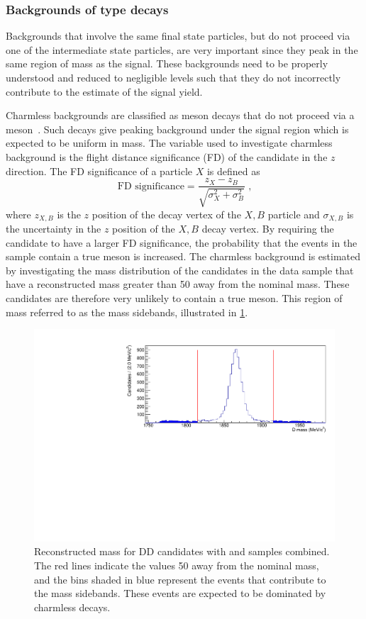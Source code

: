 \subsubsection{Backgrounds of type \boldmath {} decays}
\label{sec:backgrounds:charmless}

Backgrounds that involve the same final state particles, but do not proceed via one of the intermediate state particles, are very important since they peak in the same region of \Bm mass as the signal. These backgrounds need to be properly understood and reduced to negligible levels such that they do not incorrectly contribute to the estimate of the signal yield. 

Charmless backgrounds are classified as \Bm meson decays that do not proceed via a \Dz meson~\eg \decay{\Bm}{\Kstarm\pip\pim}. Such decays give peaking background under the signal region which is expected to be uniform in \Dz mass. The variable used to investigate charmless background is the flight distance significance (FD) of the \Dz candidate in the $z$ direction. The FD significance of a particle $X$ is defined as
\begin{equation}
\text{FD significance} = \frac{z_X - z_B}{\sqrt{\sigma_X^2 + \sigma_B^2}} \text{ ,}
\label{FDdefinition}
\end{equation}
where $z_{X,B}$ is the $z$ position of the decay vertex of the $X,B$ particle and $\sigma_{X,B}$ is the uncertainty in the $z$ position of the $X,B$ decay vertex. By requiring the \Dz candidate to have a larger FD significance, the probability that the events in the sample contain a true \Dz meson is increased. The charmless background is estimated by investigating the \Bm mass distribution of the candidates in the data sample that have a reconstructed \Dz mass greater than 50 \mevcc away from the nominal \Dz mass. These candidates are therefore very unlikely to contain a true \Dz meson. This region of \Dz mass referred to as the \Dz mass sidebands, illustrated in \fig\ref{Dsidebands}.

\begin{figure}
\centering
\includegraphics[width=0.8\linewidth]{figures/backgrounds/Dsidebands.pdf}
\caption{Reconstructed \Dz mass for \kpi DD candidates with \runone and \runtwo samples combined. The red lines indicate the values 50 \mevcc away from the nominal \Dz mass, and the bins shaded in blue represent the events that contribute to the \Dz mass sidebands. These events are expected to be dominated by charmless decays.}
\label{Dsidebands}
\end{figure}

